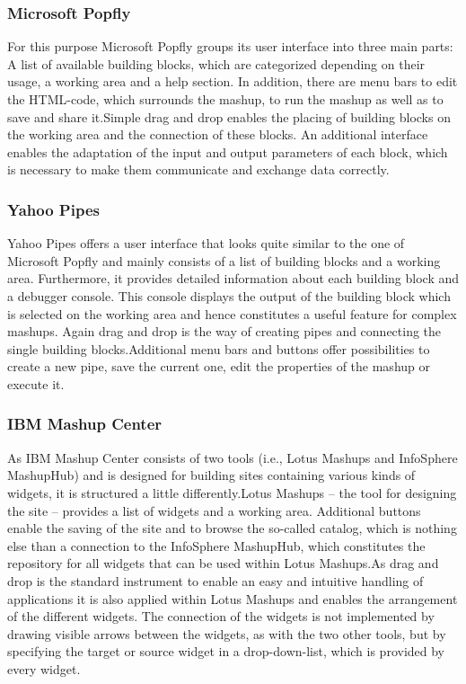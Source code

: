 \subsubsection{Microsoft Popfly}

For this purpose Microsoft Popfly groups its user interface into three main parts: A list of
available building blocks, which are categorized depending on their usage, a working area and a
help section. In addition, there are menu bars to edit the HTML-code, which surrounds the mashup,
to run the mashup as well as to save and share it.\newline Simple drag and drop enables the placing
of building blocks on the working area and the connection of these blocks. An additional interface
enables the adaptation of the input and output parameters of each block, which is necessary to
make them communicate and exchange data correctly.

\subsubsection{Yahoo Pipes}

Yahoo Pipes offers a user interface that looks quite similar to the one of Microsoft Popfly and
mainly consists of a list of building blocks and a working area. Furthermore, it provides detailed
information about each building block and a debugger console. This console displays the output of
the building block which is selected on the working area and hence constitutes a useful feature for
complex mashups. Again drag and drop is the way of creating pipes and connecting the single
building blocks.\newline Additional menu bars and buttons offer possibilities to create a new pipe,
save the current one, edit the properties of the mashup or execute it.

\subsubsection{IBM Mashup Center}

As IBM Mashup Center consists of two tools (i.e., Lotus Mashups and InfoSphere MashupHub) and is
designed for building sites containing various kinds of widgets, it is structured a little
differently.\newline Lotus Mashups -- the tool for designing the site -- provides a list of widgets
and a working area. Additional buttons enable the saving of the site and to browse the so-called
catalog, which is nothing else than a connection to the InfoSphere MashupHub, which constitutes the
repository for all widgets that can be used within Lotus Mashups.\newline As drag and drop is the
standard instrument to enable an easy and intuitive handling of applications it is also applied
within Lotus Mashups and enables the arrangement of the different widgets. The connection of the
widgets is not implemented by drawing visible arrows between the widgets, as with the two other
tools, but by specifying the target or source widget in a drop-down-list, which is provided by every
widget.

